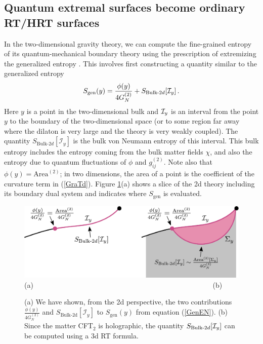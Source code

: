 \documentclass[12pt]{article}
\def\la{\label}
\def\nref#1{(\ref{#1})}
\begin{document}
\subsection{Quantum extremal surfaces become ordinary RT/HRT surfaces}

In the two-dimensional gravity theory, we can compute the fine-grained entropy  of its quantum-mechanical boundary theory using the prescription of extremizing the generalized entropy \cite{Engelhardt:2014gca}. 
This involves first constructing a quantity similar to the generalized entropy 
\begin{align} \la{GenEN}
S_\mathrm{gen}(y) =  \frac{\phi(y)}{4G_{N}^{(2)}} + S_{\mathrm{Bulk}\text{-}2d}  [{\cal I}_y] \, .
\end{align} 
Here $y$ is a point in the two-dimensional bulk and ${\cal I}_y$ is an interval from the point $y$ to the boundary of the two-dimensional space (or to  some region far away where the dilaton is very large and the theory is very weakly coupled). 
The quantity $S_{\mathrm{Bulk}\text{-}2d}[\mathcal{I}_y]$
is the bulk von Neumann entropy of this interval. 
This bulk entropy includes the entropy coming from the bulk matter fields $\chi$, and also the entropy due to quantum fluctuations of $\phi$ and $g_{ij}^{(2)}$.
Note also that $\phi(y) = \text{Area}^{(2)}$; in two dimensions, the area of a point is the coefficient of the curvature term in \nref{GraTd}.
Figure \ref{3dsgen}(a) shows a slice of the 2d theory including its boundary dual system and indicates where $S_{\text{gen}}$ is evaluated.
\begin{figure}[t]
    \begin{center}
    \includegraphics[scale=.6]{Figures/3dsgen}
 \\ (a) ~~~~~~~~~~~~~~~~~~~~~~~~~~~~~~~~~~~~~~~~~~~~~~~~~~(b) 
    \end{center}
    \caption{(a) We have shown, from the 2d perspective, the two contributions $\frac{\phi(y)}{4G_N^{(2)}}$ and $S_\text{Bulk-2d}[\mathcal{I}_y]$ to $S_\text{gen}(y)$ from equation (\ref{GenEN}). (b)  Since the matter CFT$_2$ is holographic, the quantity $S_{\mathrm{Bulk}\text{-}2d}  [{\cal I}_y]$ can be computed using a 3d RT formula.}
    \label{3dsgen}
\end{figure}
\end{document}
